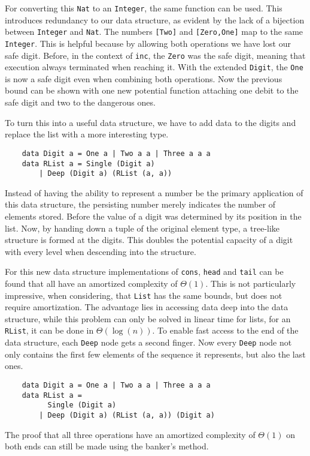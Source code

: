 For converting this \texttt{Nat} to an \texttt{Integer}, the same function can be used. This introduces redundancy to our data structure, as evident by the lack of a bijection between \texttt{Integer} and \texttt{Nat}. The numbers \texttt{[Two]} and \texttt{[Zero,One]} map to the same \texttt{Integer}. This is helpful because by allowing both operations we have lost our safe digit. Before, in the context of \texttt{inc}, the \texttt{Zero} was the safe digit, meaning that execution always terminated when reaching it. With the extended \texttt{Digit}, the \texttt{One} is now a safe digit even when combining both operations. Now the previous bound can be shown with one new potential function attaching one debit to the safe digit and two to the dangerous ones.\par
To turn this into a useful data structure, we have to add data to the digits and replace the list with a more interesting type.
\begin{verbatim}
    data Digit a = One a | Two a a | Three a a a
    data RList a = Single (Digit a) 
        | Deep (Digit a) (RList (a, a))
\end{verbatim}
Instead of having the ability to represent a number be the primary application of this data structure, the persisting number merely indicates the number of elements stored. Before the value of a digit was determined by its position in the list. Now, by handing down a tuple of the original element type, a tree-like structure is formed at the digits. This doubles the potential capacity of a digit with every level when descending into the structure.\par
For this new data structure implementations of \texttt{cons}, \texttt{head} and \texttt{tail} can be found that all have an amortized complexity of \(\Theta(1)\). This is not particularly impressive, when considering, that \texttt{List} has the same bounds, but does not require amortization. The advantage lies in accessing data deep into the data structure, while this problem can only be solved in linear time for lists, for an \texttt{RList}, it can be done in \(\Theta(\log (n))\). To enable fast access to the end of the data structure, each \texttt{Deep} node gets a second finger. Now every \texttt{Deep} node not only contains the first few elements of the sequence it represents, but also the last ones.
\begin{verbatim}
    data Digit a = One a | Two a a | Three a a a
    data RList a =
          Single (Digit a)
        | Deep (Digit a) (RList (a, a)) (Digit a) 
\end{verbatim}
The proof that all three operations have an amortized complexity of \(\Theta(1)\) on both ends can still be made using the banker's method.


